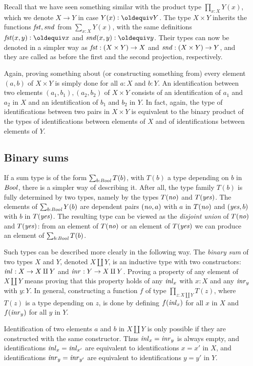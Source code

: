 Recall that we have seen something similar with the product type
$\prod_{x:X} Y(x)$, which we denote $X\to Y$ in case $Y(x)\defeq Y$.
The type $X \times Y$ inherits the functions $\mathop{\mathit{fst}},\mathop{\mathit{snd}}$ from
$\sum_{x:X} Y(x)$, with the same definitions $\fst(x,y)\defeq x$
and $\snd(x,y)\defeq y$. Their types can now be denoted in a
simpler way as $\mathop{\mathit{fst}}: (X \times Y)\to X$ and 
$\mathop{\mathit{snd}}: (X \times Y)\to Y$, and they are called as before the
first and the second projection, respectively.

Again, proving something about (or constructing something from) every 
element $(a,b)$ of $X \times Y$ is simply done for all $a:X$ and $b:Y$.
An identification between two elements $(a_1,b_1),(a_2,b_2)$ of 
$X \times Y$ consists of an identification of $a_1$ and $a_2$ in $X$
and an identification of $b_1$ and $b_2$ in $Y$. In fact, 
again, the type of identifications between two pairs in $X \times Y$
is equivalent to the binary product of the types of identifications between
elements of $X$ and of identifications between elements of $Y$.

\subsection{Binary sums}
\label{sec:binsum-types}
If a sum type is of the form $\sum_{b:\mathop{\mathit{Bool}}} T(b)$, with $T(b)$
a type depending on $b$ in $\mathop{\mathit{Bool}}$, there is a simpler way of
describing it. After all, the type family $T(b)$ is fully determined
by two types, namely by the types $T(\mathop{\mathit{no}})$ and $T(\mathop{\mathit{yes}})$.
The elements of $\sum_{b:\mathop{\mathit{Bool}}} Y(b)$ are dependent pairs $(\mathop{\mathit{no}},a)$ with
$a$ in $T(\mathop{\mathit{no}})$ and $(\mathop{\mathit{yes}},b)$ with $b$ in $T(\mathop{\mathit{yes}})$. The resulting
type can be viewed as the \emph{disjoint union} of $T(\mathop{\mathit{no}})$ and $T(\mathop{\mathit{yes}})$:
from an element of $T(\mathop{\mathit{no}})$ or an element of $T(\mathop{\mathit{yes}})$ 
we can produce an element of $\sum_{b:\mathop{\mathit{Bool}}} T(b)$.  

Such types can be described more clearly in the following way.
The \emph{binary sum} of two types $X$ and $Y$, denoted $X \amalg Y$,
is an inductive type with two constructors: $\mathop{{\it inl}_{}} : X \to X \amalg Y$ and
$\mathop{{\it inr}_{}} : Y \to X \amalg Y$. Proving a property of any element of $X \amalg Y$
means proving that this property holds of any $\mathop{{\it inl}_{x}}$ with $x:X$ and any
$\mathop{{\it inr}_{y}}$ with $y:Y$. In general, constructing a function $f$ of type
$\prod_{z: X \amalg Y} T(z)$, where $T(z)$ is a type depending on 
$z$, is done by defining $f(\mathop{{\it inl}_{x}})$ for all $x$ in $X$
and $f(\mathop{{\it inr}_{y}})$ for all $y$ in $Y$.

Identification of two elements $a$ and $b$ in $X \amalg Y$ is 
only possible if they are constructed with the same constructor.
Thus $\mathop{{\it inl}_{x}} = \mathop{{\it inr}_{y}}$ is always empty, and identifications
$\mathop{{\it inl}_{x}} = \mathop{{\it inl}_{x'}}$ are equivalent to identifications $x=x'$ in $X$,
and identifications
$\mathop{{\it inr}_{y}} = \mathop{{\it inr}_{y'}}$ are equivalent to identifications $y=y'$ in $Y$.

